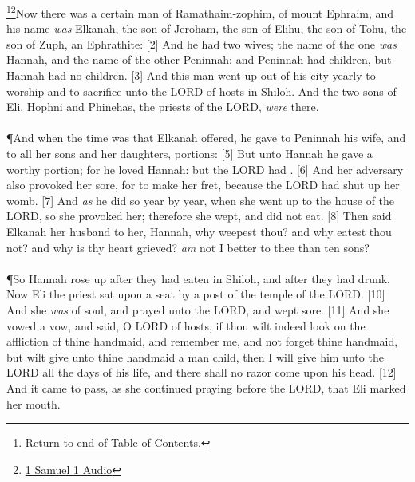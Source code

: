 \footnote{\textcolor[cmyk]{0.99998,1,0,0}{\hyperlink{TOC}{Return to end of Table of Contents.}}}\footnote{\href{https://audiobible.com/bible/1_samuel_1.html}{\textcolor[cmyk]{0.99998,1,0,0}{1 Samuel 1 Audio}}}\textcolor[cmyk]{0.99998,1,0,0}{Now there was a certain man of Ramathaim-zophim, of mount Ephraim, and his name \emph{was} Elkanah, the son of Jeroham, the son of Elihu, the son of Tohu, the son of Zuph, an Ephrathite:}
[2] \textcolor[cmyk]{0.99998,1,0,0}{And he had two wives; the name of the one \emph{was} Hannah, and the name of the other Peninnah: and Peninnah had children, but Hannah had no children.}
[3] \textcolor[cmyk]{0.99998,1,0,0}{And this man went up out of his city yearly to worship and to sacrifice unto the LORD of hosts in Shiloh. And the two sons of Eli, Hophni and Phinehas, the priests of the LORD, \emph{were} there.}\\
\\
\P \textcolor[cmyk]{0.99998,1,0,0}{And when the time was that Elkanah offered, he gave to Peninnah his wife, and to all her sons and her daughters, portions:}
[5] \textcolor[cmyk]{0.99998,1,0,0}{But unto Hannah he gave a worthy portion; for he loved Hannah: but the LORD had .}
[6] \textcolor[cmyk]{0.99998,1,0,0}{And her adversary also provoked her sore, for to make her fret, because the LORD had shut up her womb.}
[7] \textcolor[cmyk]{0.99998,1,0,0}{And \emph{as} he did so year by year, when she went up to the house of the LORD, so she provoked her; therefore she wept, and did not eat.}
[8] \textcolor[cmyk]{0.99998,1,0,0}{Then said Elkanah her husband to her, Hannah, why weepest thou? and why eatest thou not? and why is thy heart grieved? \emph{am} not I better to thee than ten sons?}\\
\\
\P \textcolor[cmyk]{0.99998,1,0,0}{So Hannah rose up after they had eaten in Shiloh, and after they had drunk. Now Eli the priest sat upon a seat by a post of the temple of the LORD.}
[10] \textcolor[cmyk]{0.99998,1,0,0}{And she \emph{was}  of soul, and prayed unto the LORD, and wept sore.}
[11] \textcolor[cmyk]{0.99998,1,0,0}{And she vowed a vow, and said, O LORD of hosts, if thou wilt indeed look on the affliction of thine handmaid, and remember me, and not forget thine handmaid, but wilt give unto thine handmaid a man child, then I will give him unto the LORD all the days of his life, and there shall no razor come upon his head.}
[12] \textcolor[cmyk]{0.99998,1,0,0}{And it came to pass, as she continued praying before the LORD, that Eli marked her mouth.}

